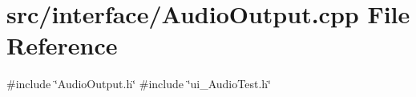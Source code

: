 \section{src/interface/\+Audio\+Output.cpp File Reference}
\label{_audio_output_8cpp}
{\ttfamily \#include \char`\"{}Audio\+Output.\+h\char`\"{}}\newline
{\ttfamily \#include \char`\"{}ui\+\_\+\+Audio\+Test.\+h\char`\"{}}\newline
